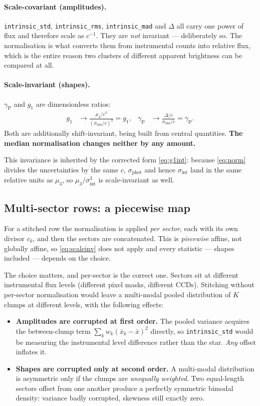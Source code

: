 \documentclass[11pt]{article}
\newcommand{\istd}{\texttt{intrinsic\_std}}
\newcommand{\irms}{\texttt{intrinsic\_rms}}
\newcommand{\imad}{\texttt{intrinsic\_mad}}
\newcommand{\gp}{\gamma_{\mathrm{P}}}
\newcommand{\sigobs}{\sigma_{\mathrm{obs}}}
\newcommand{\sigphot}{\sigma_{\mathrm{phot}}}
\newcommand{\sigint}{\sigma_{\mathrm{int}}}
\begin{document}
\paragraph{Scale-covariant (amplitudes).} \istd, \irms, \imad{} and $\Delta$ all
carry one power of flux and therefore scale as $c^{-1}$. They are \emph{not}
invariant --- deliberately so. The normalisation is what converts them from
instrumental counts into relative flux, which is the entire reason two clusters
of different apparent brightness can be compared at all.

\paragraph{Scale-invariant (shapes).} $\gp$ and $g_1$ are dimensionless ratios:
%
\begin{align}
  g_1 &\to \frac{\mu_3/c^{3}}{(\sigobs/c)^{3}} = g_1,
  &
  \gp &\to \frac{\Delta/c}{\sigobs/c} = \gp .
  \label{eq:scaleinv}
\end{align}
%
Both are additionally shift-invariant, being built from central quantities.
\textbf{The median normalisation changes neither by any amount.}

This invariance is inherited by the corrected form \eqref{eq:g1int}: because
\eqref{eq:norm} divides the uncertainties by the same $c$, $\sigphot$ and hence
$\sigint$ land in the same relative units as $\mu_3$, so
$\mu_3/\sigint^3$ is scale-invariant as well.

\subsection{Multi-sector rows: a piecewise map}

For a stitched row the normalisation is applied \emph{per sector}, each with its
own divisor $c_k$, and then the sectors are concatenated. This is
\emph{piecewise} affine, not globally affine, so \eqref{eq:scaleinv} does not
apply and every statistic --- shapes included --- depends on the choice.

The choice matters, and per-sector is the correct one. Sectors sit at different
instrumental flux levels (different pixel masks, different CCDs). Stitching
without per-sector normalisation would leave a multi-modal pooled distribution of
$K$ clumps at different levels, with the following effects:

\begin{itemize}
  \item \textbf{Amplitudes are corrupted at first order.} The pooled variance
        acquires the between-clump term $\sum_k w_k (\bar{x}_k - \bar{x})^2$
        directly, so \istd{} would be measuring the instrumental level
        difference rather than the star. \emph{Any} offset inflates it.
  \item \textbf{Shapes are corrupted only at second order.} A multi-modal
        distribution is asymmetric only if the clumps are \emph{unequally
        weighted}. Two equal-length sectors offset from one another produce a
        perfectly symmetric bimodal density: variance badly corrupted, skewness
        still exactly zero.
\end{itemize}
\end{document}
